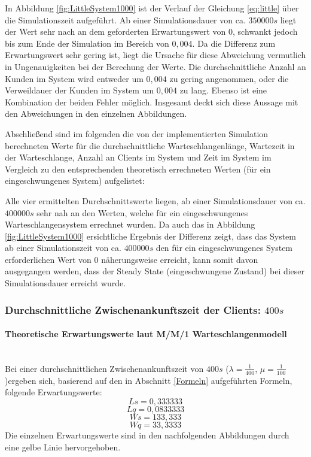 In Abbildung \ref{fig:LittleSystem1000} ist der Verlauf der Gleichung \ref{eq:little} über die Simulationszeit aufgeführt. Ab einer Simulationsdauer von ca. $350000s$ liegt der Wert sehr nach an dem geforderten Erwartungswert von $0$, schwankt jedoch bis zum Ende der Simulation im Bereich von $0,004$. Da die Differenz zum Erwartungswert sehr gering ist, liegt die Ursache für diese Abweichung vermutlich in Ungenauigkeiten bei der Berechung der Werte. Die durchschnittliche Anzahl an Kunden im System wird entweder um $0,004$ zu gering angenommen, oder die Verweildauer der Kunden im System um $0,004$ zu lang. Ebenso ist eine Kombination der beiden Fehler möglich. Insgesamt deckt sich diese Aussage mit den Abweichungen in den einzelnen Abbildungen.

Abschließend sind im folgenden die von der implementierten Simulation berechneten Werte für die durchschnittliche Warteschlangenlänge, Wartezeit in der Warteschlange, Anzahl an Clients im System und Zeit im System im Vergleich zu den entsprechenden theoretisch errechneten Werten (für ein eingeschwungenes System) aufgelistet:


Alle vier ermittelten Durchschnittswerte liegen, ab einer Simulationsdauer von ca. $400000s$ sehr nah an den Werten, welche für ein eingeschwungenes Warteschlangensystem errechnet wurden. Da auch das in Abbildung  \ref{fig:LittleSystem1000} ersichtliche Ergebnis der Differenz zeigt, dass das System ab einer Simulationszeit von ca. $400000s$ den für ein eingeschwungenes System erforderlichen Wert von $0$ näherungsweise erreicht, kann somit davon ausgegangen werden, dass der Steady State (eingeschwungene Zustand) bei dieser Simulationsdauer erreicht wurde.

\subsubsection{Durchschnittliche Zwischenankunftszeit der Clients: $400s$}
\paragraph{Theoretische Erwartungswerte laut M/M/1 Warteschlangenmodell}
\label{FormenlnMM1}
\\
Bei einer durchschnittlichen Zwischenankunftszeit von $400s$ ($\lambda=\frac{1}{400}$, $\mu=\frac{1}{100}$)ergeben sich, basierend auf den in Abschnitt \ref{Formeln} aufgeführten Formeln, folgende Erwartungswerte:
\begin{equation}
Ls=0,333333
\end{equation}
\begin{equation}
Lq=0,0833333
\end{equation}
\begin{equation}
Ws=133,333
\end{equation}
\begin{equation}
Wq=33,3333
\end{equation}
Die einzelnen Erwartungswerte sind in den nachfolgenden Abbildungen durch eine gelbe Linie hervorgehoben.

